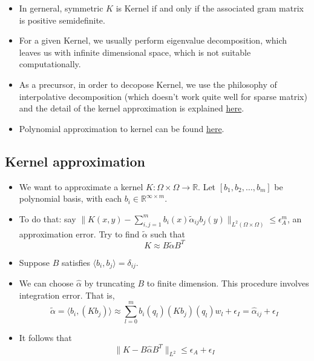 \documentclass[11pt,reqno]{amsart}
\theoremstyle{remark}
\newtheorem{example}{Example}
\begin{document}
\begin{sloppypar}
\begin{itemize}
\begin{example}
\[=\langle \psi(x),\psi(x')\rangle
\]
by putting 
\[
\psi(x)=[\prod x_{J_{1,i}},\prod x_{J_{2,i}},\dots, \prod x_{J_{(n+1)^k,i}}]
\]
\end{example}
\begin{example}
Let $K(x,x')=\exp(-\frac{\lVert x-x'\rVert^2}{2\sigma})$.
By setting $\psi(x)=\frac{1}{\sqrt{n!}}\exp(-\frac{x^2}{2})x^n, n=0,1,\dots$, we have
\[
\langle \psi(x),\psi(x')\rangle=\exp(-\frac{\lVert x-x'\rVert^2}{2})
\]
\end{example}
\item In gerneral, symmetric $K$ is Kernel if and only if the associated gram matrix is positive semidefinite.
\item For a given Kernel, we usually perform eigenvalue decomposition, which leaves us with infinite dimensional space, 
which is not suitable computationally.
\item As a precursor, in order to decopose Kernel, we use the philosophy of interpolative decomposition (which doesn't work quite well for sparse matrix)
 and the detail of the kernel approximation is explained \href{https://arxiv.org/pdf/2006.02545.pdf}{here}.
\item Polynomial approximation to kernel can be found \href{https://arxiv.org/pdf/1109.4603.pdf}{here}.
\end{itemize}

\subsection*{Kernel approximation}
\begin{itemize}
\item We want to approximate a kernel $K:\Omega\times\Omega\to\mathbb{R}$. Let $[b_1,b_2,\dots,b_m]$ be polynomial basis, with each $b_i\in\mathbb{R}^{\infty\times m}$.
\item To do that: say $\lVert K(x,y)-\sum\limits^m_{i,j=1}b_i(x)\tilde\alpha_{ij}b_j(y)\rVert_{L^2(\Omega\times\Omega)}\leq\epsilon^m_A$, an approximation error. Try to find $\tilde\alpha$ such that
\[
K\approx B\tilde \alpha B^T
\]
\item Suppose $B$ satisfies $\langle b_i,b_j\rangle=\delta_{ij}$. 
\item We can choose $\hat\alpha$ by truncating $B$ to finite dimension. This procedure involves integration error. That is, 
\[
\tilde\alpha=\langle b_i, (Kb_j)\rangle\approx\sum_{l=0}^{m}b_i(q_l)(Kb_j)(q_l)w_l+\epsilon_I=\hat\alpha_{ij}+\epsilon_I
\]
\item It follows that 
\[
\lVert K-B\hat \alpha B^T\rVert_{L^2}\leq \epsilon_A+\epsilon_I
\]


\end{itemize}
\end{sloppypar}
\end{document}
